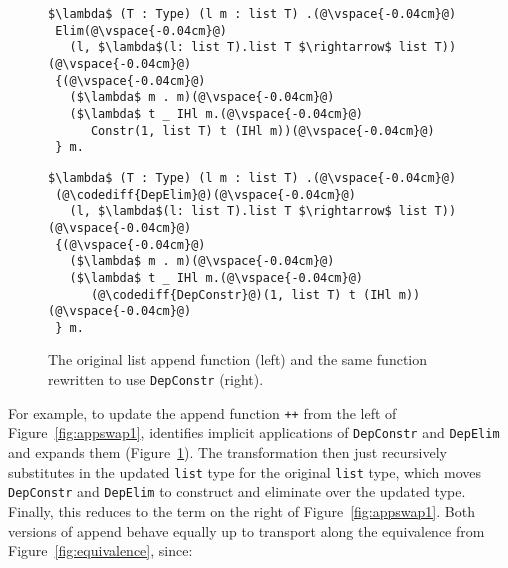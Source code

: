 \begin{figure}
\begin{minipage}{0.48\textwidth}
\begin{lstlisting}
$\lambda$ (T : Type) (l m : list T) .(@\vspace{-0.04cm}@)
 Elim(@\vspace{-0.04cm}@)
   (l, $\lambda$(l: list T).list T $\rightarrow$ list T))(@\vspace{-0.04cm}@)
 {(@\vspace{-0.04cm}@)
   ($\lambda$ m . m)(@\vspace{-0.04cm}@)
   ($\lambda$ t _ IHl m.(@\vspace{-0.04cm}@)
      Constr(1, list T) t (IHl m))(@\vspace{-0.04cm}@)
 } m.
\end{lstlisting}
\end{minipage}
\hfill
\begin{minipage}{0.48\textwidth}
\begin{lstlisting}
$\lambda$ (T : Type) (l m : list T) .(@\vspace{-0.04cm}@)
 (@\codediff{DepElim}@)(@\vspace{-0.04cm}@)
   (l, $\lambda$(l: list T).list T $\rightarrow$ list T))(@\vspace{-0.04cm}@)
 {(@\vspace{-0.04cm}@)
   ($\lambda$ m . m)(@\vspace{-0.04cm}@)
   ($\lambda$ t _ IHl m.(@\vspace{-0.04cm}@)
      (@\codediff{DepConstr}@)(1, list T) t (IHl m))(@\vspace{-0.04cm}@)
 } m.
\end{lstlisting}
\end{minipage}
\vspace{-0.2cm}
\caption{The original list append function (left) and the same function rewritten to use \lstinline{DepConstr} (right).}
\label{fig:appswap2}
\end{figure}

For example, to update the append function \lstinline{++} from the left of Figure~\ref{fig:appswap1}, \toolname
identifies implicit applications of \lstinline{DepConstr} and \lstinline{DepElim} and expands them (Figure~\ref{fig:appswap2}).
The transformation then just recursively substitutes in the updated \lstinline{list} type
for the original \lstinline{list} type, which moves \lstinline{DepConstr} and \lstinline{DepElim}
to construct and eliminate over the updated type.
Finally, this reduces to the term on the right of Figure~\ref{fig:appswap1}.
Both versions of append behave equally up to transport along the equivalence from Figure~\ref{fig:equivalence}, since:


